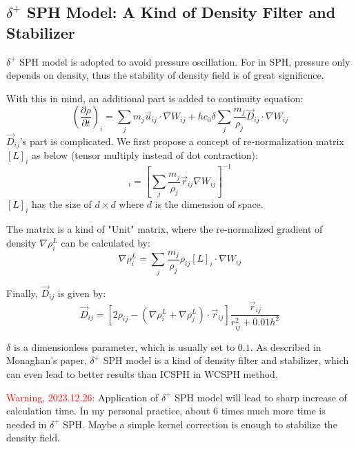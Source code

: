 \subsection{$\delta^+$ SPH Model: A Kind of Density Filter and Stabilizer}

$\delta^+$ SPH model is adopted to avoid pressure oscillation.
For in SPH, pressure only depends on density, 
thus the stability of density field is of great significnce.

With this in mind, an additional part is added to continuity equation:
\begin{equation}
    \left(
        \frac{\partial \rho}{\partial t}
    \right)_i
    =
    \sum_j m_j \vec{u}_{ij} \cdot \nabla W_{ij}
    +
    h c_0 \delta
    \sum_j  \frac{m_j}{\rho_j} \vec{D}_{ij}\cdot \nabla W_{ij}
\end{equation}
$\vec{D}_{ij}$'s part is complicated. We first propose a concept of re-normalization matrix 
$[L]_i$ as below (tensor multiply instead of dot contraction):
\begin{equation}
    [L]_i = \left[\sum_j \frac{m_j}{\rho_j}\vec{r}_{ij}\nabla W_{ij}\right]^{-1}
\end{equation}
$[L]_i$ has the size of $d\times d$ where $d$ is the dimension of space.

The matrix is a kind of "Unit" matrix, 
where the re-normalized gradient of density $\nabla \rho_i^L$ can be calculated by:
\begin{equation}
    \nabla \rho_i^L = \sum_j \frac{m_j}{\rho_j}\rho_{ij}
    [L]_i \cdot \nabla W_{ij}
\end{equation}

Finally, $\vec{D}_{ij}$ is given by:
\begin{equation}
    \vec{D}_{ij} = 
    \left[
        2\rho_{ij} - 
        \left(
            \nabla \rho_i^L + \nabla \rho_j^L
        \right)\cdot \vec{r}_{ij}
    \right]
    \frac{\vec{r}_{ij}}{r_{ij}^2 + 0.01h^2}
\end{equation}

$\delta$ is a dimensionless parameter, 
which is usually set to $0.1$.
As described in Monaghan's paper,
$\delta^+$ SPH model is a kind of density filter and stabilizer,
which can even lead to better results than ICSPH in WCSPH method.

\textcolor{red}{Warning, 2023.12.26:} Application of $\delta^+$ SPH model 
will lead to sharp increase of calculation time.
In my personal practice, 
about 6 times much more time is needed in $\delta^+$ SPH.
Maybe a simple kernel correction is enough to stabilize the density field.